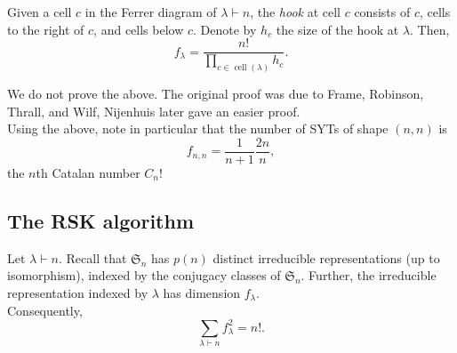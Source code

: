 	\begin{ftheo}
		Given a cell $c$ in the Ferrer diagram of $\lambda \vdash n$, the \emph{hook} at cell $c$ consists of $c$, cells to the right of $c$, and cells below $c$. Denote by $h_c$ the size of the hook at $\lambda$. Then,
		\[ f_\lambda = \frac{n!}{\prod_{c \in \operatorname{cell}(\lambda)} h_c}. \]
	\end{ftheo}
	We do not prove the above. The original proof was due to Frame, Robinson, Thrall, and Wilf, Nijenhuis later gave an easier proof.\\
	Using the above, note in particular that the number of SYTs of shape $(n,n)$ is
	\[ f_{n,n} = \frac{1}{n+1} \frac{2n}{n}, \]
	the $n$th Catalan number $C_n$!

\subsection{The RSK algorithm}

	\begin{ftheo}
		Let $\lambda \vdash n$. Recall that $\mathfrak{S}_n$ has $p(n)$ distinct irreducible representations (up to isomorphism), indexed by the conjugacy classes of $\mathfrak{S}_n$. Further, the irreducible representation indexed by $\lambda$ has dimension $f_\lambda$.\\
		Consequently,
		\[ \sum_{\lambda \vdash n} f_\lambda^2 = n!. \]
	\end{ftheo}


